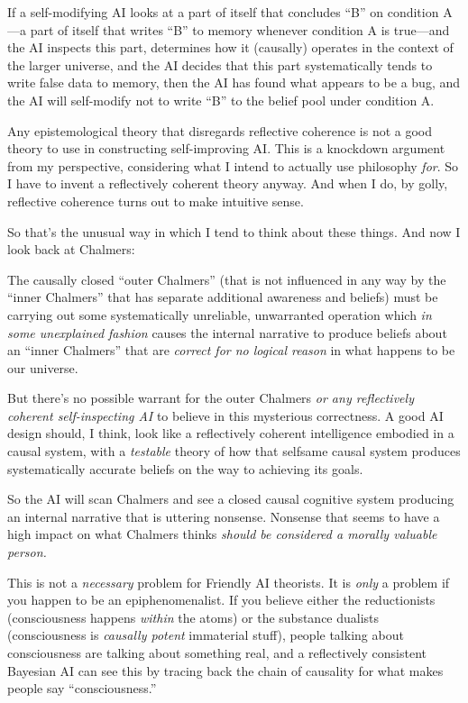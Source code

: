 {
 If a self-modifying AI looks at a part of itself that concludes
``B'' on condition A---a part of
itself that writes ``B'' to memory
whenever condition A is true---and the AI inspects this part,
determines how it (causally) operates in the context of the larger
universe, and the AI decides that this part systematically tends to
write false data to memory, then the AI has found what appears to be a
bug, and the AI will self-modify not to write
``B'' to the belief pool under
condition A.}

{
 Any epistemological theory that disregards reflective coherence is
not a good theory to use in constructing self-improving AI. This is a
knockdown argument from my perspective, considering what I intend to
actually use philosophy \textit{for}. So I have to invent a
reflectively coherent theory anyway. And when I do, by golly,
reflective coherence turns out to make intuitive sense.}

{
 So that's the unusual way in which I tend to think
about these things. And now I look back at Chalmers:}

{
 The causally closed ``outer
Chalmers'' (that is not influenced in any way by the
``inner Chalmers'' that has separate
additional awareness and beliefs) must be carrying out some
systematically unreliable, unwarranted operation which \textit{in some
unexplained fashion} causes the internal narrative to produce beliefs
about an ``inner Chalmers'' that are
\textit{correct for no logical reason} in what happens to be our
universe.}

{
 But there's no possible warrant for the outer
Chalmers \textit{or any reflectively coherent self-inspecting AI} to
believe in this mysterious correctness. A good AI design should, I
think, look like a reflectively coherent intelligence embodied in a
causal system, with a \textit{testable} theory of how that selfsame
causal system produces systematically accurate beliefs on the way to
achieving its goals.}

{
 So the AI will scan Chalmers and see a closed causal cognitive
system producing an internal narrative that is uttering nonsense.
Nonsense that seems to have a high impact on what Chalmers thinks
\textit{should be considered a morally valuable person.}}

{
 This is not a \textit{necessary} problem for Friendly AI
theorists. It is \textit{only} a problem if you happen to be an
epiphenomenalist. If you believe either the reductionists
(consciousness happens \textit{within} the atoms) or the substance
dualists (consciousness is \textit{causally potent} immaterial stuff),
people talking about consciousness are talking about something real,
and a reflectively consistent Bayesian AI can see this by tracing back
the chain of causality for what makes people say
``consciousness.''}


